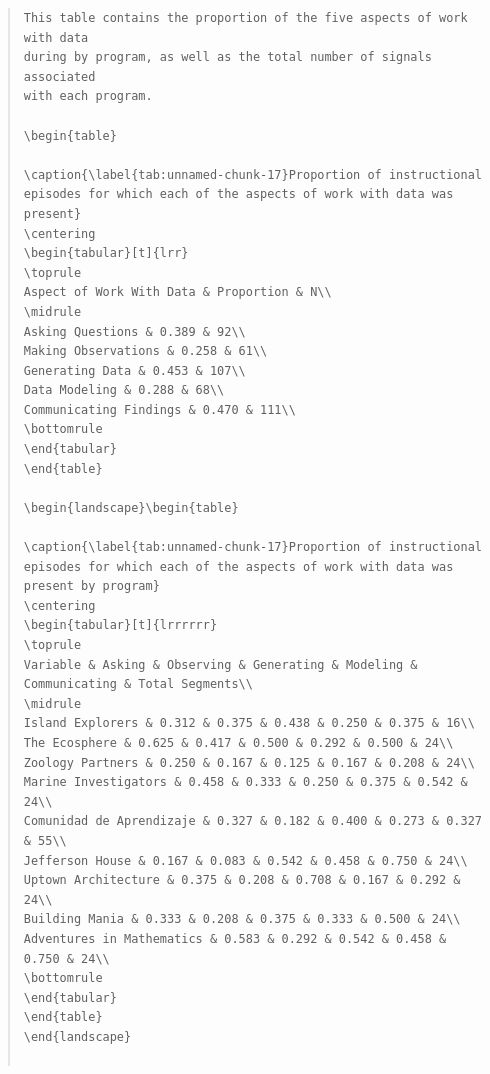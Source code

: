 \documentclass[]{msu-thesis}
\theoremstyle{definition}
\theoremstyle{definition}
\theoremstyle{definition}
\theoremstyle{remark}
\begin{document}
\begin{quote}
\begin{lstlisting}
This table contains the proportion of the five aspects of work with data
during by program, as well as the total number of signals associated
with each program.

\begin{table}

\caption{\label{tab:unnamed-chunk-17}Proportion of instructional episodes for which each of the aspects of work with data was present}
\centering
\begin{tabular}[t]{lrr}
\toprule
Aspect of Work With Data & Proportion & N\\
\midrule
Asking Questions & 0.389 & 92\\
Making Observations & 0.258 & 61\\
Generating Data & 0.453 & 107\\
Data Modeling & 0.288 & 68\\
Communicating Findings & 0.470 & 111\\
\bottomrule
\end{tabular}
\end{table}

\begin{landscape}\begin{table}

\caption{\label{tab:unnamed-chunk-17}Proportion of instructional episodes for which each of the aspects of work with data was present by program}
\centering
\begin{tabular}[t]{lrrrrrr}
\toprule
Variable & Asking & Observing & Generating & Modeling & Communicating & Total Segments\\
\midrule
Island Explorers & 0.312 & 0.375 & 0.438 & 0.250 & 0.375 & 16\\
The Ecosphere & 0.625 & 0.417 & 0.500 & 0.292 & 0.500 & 24\\
Zoology Partners & 0.250 & 0.167 & 0.125 & 0.167 & 0.208 & 24\\
Marine Investigators & 0.458 & 0.333 & 0.250 & 0.375 & 0.542 & 24\\
Comunidad de Aprendizaje & 0.327 & 0.182 & 0.400 & 0.273 & 0.327 & 55\\
Jefferson House & 0.167 & 0.083 & 0.542 & 0.458 & 0.750 & 24\\
Uptown Architecture & 0.375 & 0.208 & 0.708 & 0.167 & 0.292 & 24\\
Building Mania & 0.333 & 0.208 & 0.375 & 0.333 & 0.500 & 24\\
Adventures in Mathematics & 0.583 & 0.292 & 0.542 & 0.458 & 0.750 & 24\\
\bottomrule
\end{tabular}
\end{table}
\end{landscape}


\end{lstlisting}
\end{quote}
\end{document}
